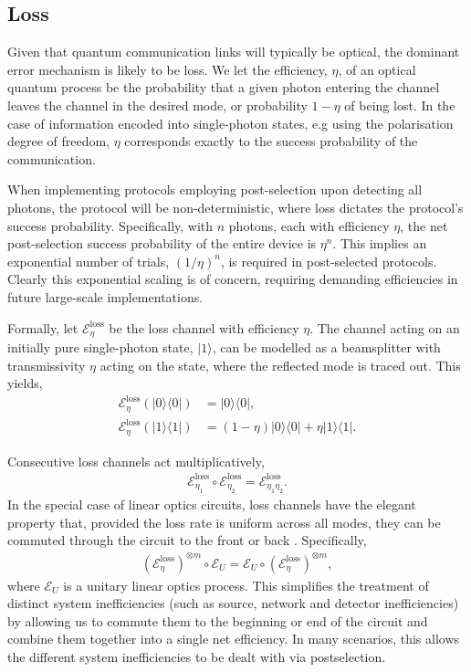 \documentclass[aps,rmp,twocolumn,amsmath,amssymb,nofootinbib,superscriptaddress]{revtex4}
\newcommand{\bra}[1]{\langle#1|}
\newcommand{\ket}[1]{|#1\rangle}
\begin{document}
%
%

\subsection{Loss} \label{sec:eff_err}

Given that quantum communication links will typically be optical, the dominant error mechanism is likely to be loss. We let the efficiency, $\eta$, of an optical quantum process be the probability that a given photon entering the channel leaves the channel in the desired mode, or probability \mbox{$1-\eta$} of being lost. In the case of information encoded into single-photon states, e.g using the polarisation degree of freedom, $\eta$ corresponds exactly to the success probability of the communication.

When implementing protocols employing post-selection upon detecting all photons, the protocol will be non-deterministic, where loss dictates the protocol's success probability. Specifically, with $n$ photons, each with efficiency $\eta$, the net post-selection success probability of the entire device is $\eta^n$. This implies an exponential number of trials, \mbox{$(1/\eta)^n$}, is required in post-selected protocols. Clearly this exponential scaling is of concern, requiring demanding efficiencies in future large-scale implementations.

Formally, let $\mathcal{E}^\mathrm{loss}_\eta$ be the loss channel with efficiency $\eta$. The channel acting on an initially pure single-photon state, $\ket{1}$, can be modelled as a beamsplitter with transmissivity $\eta$ acting on the state, where the reflected mode is traced out. This yields,
\begin{align}
\mathcal{E}^\mathrm{loss}_\eta(\ket{0}\bra{0}) &= \ket{0}\bra{0}, \nonumber \\
\mathcal{E}^\mathrm{loss}_\eta(\ket{1}\bra{1}) &= (1-\eta)\ket{0}\bra{0} + \eta\ket{1}\bra{1}.
\end{align}

Consecutive loss channels act multiplicatively,
\begin{align}
\mathcal{E}_{\eta_1}^\mathrm{loss} \circ \mathcal{E}_{\eta_2}^\mathrm{loss} = \mathcal{E}_{\eta_1 \eta_2}^\mathrm{loss}.
\end{align}
In the special case of linear optics circuits, loss channels have the elegant property that, provided the loss rate is uniform across all modes, they can be commuted through the circuit to the front or back \cite{???}. Specifically,
\begin{align}
(\mathcal{E}_{\eta}^\mathrm{loss})^{\otimes m} \circ \mathcal{E}_U = \mathcal{E}_U \circ (\mathcal{E}_{\eta}^\mathrm{loss})^{\otimes m},
\end{align}
where $\mathcal{E}_U$ is a unitary linear optics process. This simplifies the treatment of distinct system inefficiencies (such as source, network and detector inefficiencies) by allowing us to commute them to the beginning or end of the circuit and combine them together into a single net efficiency. In many scenarios, this allows the different system inefficiencies to be dealt with via postselection.
\end{document}
